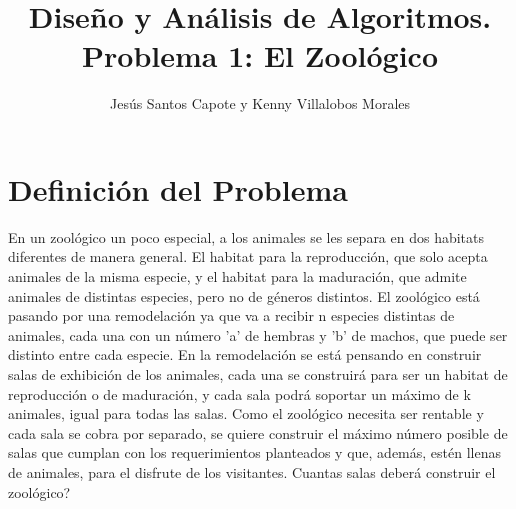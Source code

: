 \documentclass[article]{llncs}
\begin{document}
%
\title{Dise\~{n}o y An\'alisis de Algoritmos. Problema 1: El Zool\'ogico}
%
%
\author{Jes\'us Santos Capote y Kenny Villalobos Morales}
%
%
\maketitle              %
%
\section{Definici\'on del Problema}

En un zoológico un poco especial, a los animales se les separa en dos 
habitats diferentes de manera general. 
El habitat para la reproducción, que solo acepta animales de la misma 
especie, y el habitat para la maduración, 
que admite animales de distintas especies, pero no de géneros distintos. El zoológico está pasando por una 
remodelación ya que va a recibir n especies distintas de animales, cada una con un número 'a' de hembras y 'b' 
de machos, que puede ser distinto entre cada especie. En la remodelación se está pensando en construir salas de 
exhibición de los animales, cada una se construirá para ser un habitat de reproducción o de maduración, y cada 
sala podrá soportar un máximo de k animales, igual para todas las salas. Como el zoológico necesita ser rentable 
y cada sala se cobra por separado, se quiere construir el máximo número posible de salas que cumplan con los 
requerimientos planteados y que, además, estén llenas de animales, para el disfrute de los visitantes. Cuantas 
salas deberá construir el zoológico?
\end{document}
